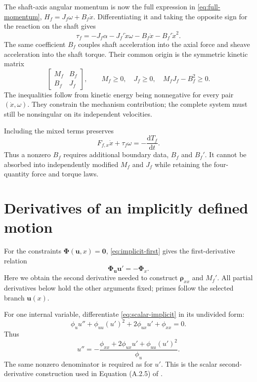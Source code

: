 \documentclass[11pt,letterpaper]{article}
\numberwithin{equation}{section}
\newcommand{\dd}{\mathrm{d}}
\newcommand{\rhoo}{\bm\rho}
\newcommand{\source}{\cite{formulation}}
\begin{document}
The shaft-axis angular momentum is now the full expression in \cref{eq:full-momentum}, $H_f=J_f\omega+B_f\dot x$. Differentiating it and taking the opposite sign for the reaction on the shaft gives
\begin{equation}
  \boxed{\tau_f=-J_f\alpha-J_f'\dot x\omega
                     -B_f\ddot x-B_f'\dot x^2.}
  \label{eq:mixed-torque}
\end{equation}
The same coefficient $B_f$ couples shaft acceleration into the axial force and sheave acceleration into the shaft torque. Their common origin is the symmetric kinetic matrix
\begin{equation}
  \begin{bmatrix}M_f&B_f\\B_f&J_f\end{bmatrix},
  \qquad M_f\ge0,\quad J_f\ge0,\quad M_fJ_f-B_f^2\ge0.
\end{equation}
The inequalities follow from kinetic energy being nonnegative for every pair $(\dot x,\omega)$. They constrain the mechanism contribution; the complete system must still be nonsingular on its independent velocities.

Including the mixed terms preserves
\begin{equation}
  F_{f,x}\dot x+\tau_f\omega=-\frac{\dd T_f}{\dd t}.
\end{equation}
Thus a nonzero $B_f$ requires additional boundary data, $B_f$ and $B_f'$. It cannot be absorbed into independently modified $M_f$ and $J_f$ while retaining the four-quantity force and torque laws.

\clearpage
\section{Derivatives of an implicitly defined motion}
\label{app:constraints}
\par

For the constraints $\bm\Phi(\bm u,x)=\bm0$, \cref{eq:implicit-first} gives the first-derivative relation
\begin{equation}
  \bm\Phi_{\bm u}\bm u'=-\bm\Phi_x.
\end{equation}
Here we obtain the second derivative needed to construct $\rhoo_{xx}$ and $M_f'$. All partial derivatives below hold the other arguments fixed; primes follow the selected branch $\bm u(x)$.

For one internal variable, differentiate \cref{eq:scalar-implicit} in its undivided form:
\begin{equation}
  \phi_u u''+\phi_{uu}(u')^2+2\phi_{ux}u'+\phi_{xx}=0.
\end{equation}
Thus
\begin{equation}
  u''=-\frac{\phi_{xx}+2\phi_{ux}u'+\phi_{uu}(u')^2}{\phi_u}.
\end{equation}
The same nonzero denominator is required as for $u'$. This is the scalar second-derivative construction used in Equation (A.2.5) of \source.
\end{document}
